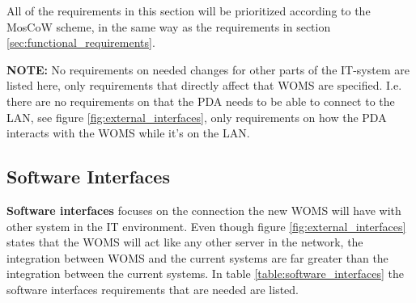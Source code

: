 All of the requirements in this section will be prioritized according to the MosCoW scheme, in the same way as the requirements in section \ref{sec:functional_requirements}.	

\textbf{NOTE:} No requirements on needed changes for other parts of the IT-system are listed here, only requirements that directly affect that WOMS are specified. I.e. there are no requirements on that the PDA needs to be able to connect to the LAN, see figure \ref{fig:external_interfaces}, only requirements on how the PDA interacts with the WOMS while it's on the LAN.

\subsection{Software Interfaces}
\label{sub:software_interfaces}

\textbf{Software interfaces} focuses on the connection the new WOMS will have with other system in the IT environment. Even though figure \ref{fig:external_interfaces} states that the WOMS will act like any other server in the network, the integration between WOMS and the current systems are far greater than the integration between the current systems.  In table \ref{table:software_interfaces} the software interfaces requirements that are needed are listed.

